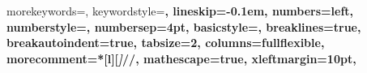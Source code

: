 
\newcommand{\jbasicstyle}{\small\sffamily} %
\newcommand{\textcode}[1]{{#1}}
\newcommand{\jnumberstyle}{\scriptsize}
\newcommand{\Hilight}{\makebox[0pt][l]{\color{gray}\rule[-3pt]{0.80\linewidth}{9pt}}}

{
  morekeywords={},
  keywordstyle=\bfseries,
  lineskip=-0.1em,
  numbers=left, %
  numberstyle=\jnumberstyle,
  numbersep=4pt,
  basicstyle=\jbasicstyle,
  breaklines=true,
  breakautoindent=true,
  tabsize=2,
  columns=fullflexible,
  morecomment=*[l][\textsl]{//},
  mathescape=true,
  xleftmargin=10pt,
}

